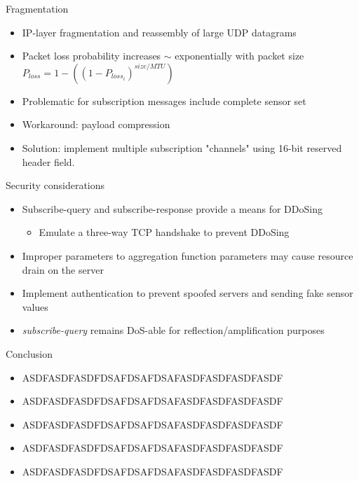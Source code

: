 \documentclass{beamer}
\begin{document}
\begin{frame}{Fragmentation}
\begin{itemize}
	\item IP-layer fragmentation and reassembly of large UDP datagrams
	\item 	Packet loss probability increases $\sim$ exponentially with packet size \\
			$P_{loss} = 1 - ((1 - P_{loss_i})^{size / MTU})$
	\item Problematic for subscription messages include complete sensor set
	\item Workaround: payload compression
	\item Solution: implement multiple subscription "channels" using 16-bit reserved header field.
\end{itemize}
\end{frame}

\begin{frame}{Security considerations}
\begin{itemize}
  \item Subscribe-query and subscribe-response provide a means for DDoSing
  \begin{itemize}
    \item Emulate a three-way TCP handshake to prevent DDoSing
  \end{itemize}
  \item Improper parameters to aggregation function parameters may cause
  resource drain on the server
  \item Implement authentication to prevent spoofed servers and sending fake
  sensor values
  \item \emph{subscribe-query} remains DoS-able for reflection/amplification purposes
\end{itemize}
\end{frame}

\begin{frame}{Conclusion}
\begin{itemize}
\item ASDFASDFASDFDSAFDSAFDSAFASDFASDFASDFASDF
\item ASDFASDFASDFDSAFDSAFDSAFASDFASDFASDFASDF
\item ASDFASDFASDFDSAFDSAFDSAFASDFASDFASDFASDF
\item ASDFASDFASDFDSAFDSAFDSAFASDFASDFASDFASDF
\item ASDFASDFASDFDSAFDSAFDSAFASDFASDFASDFASDF
\end{itemize}
\end{frame}
\end{document}
